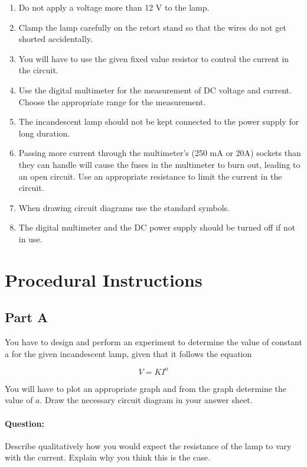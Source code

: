 \begin{enumerate}
\item Do not apply a voltage more than 12 V to the lamp.
\item Clamp the lamp carefully on the retort stand so that the wires do not get shorted accidentally.
\item You will have to use the given fixed value resistor to control the current in the circuit.
\item Use the digital multimeter for the measurement of DC voltage and current.  Choose the appropriate range for the measurement.
\item The incandescent lamp should not be kept connected to the power supply for long duration. 

\item Passing more current through the multimeter's (250 mA or 20A) sockets than they can handle will cause the fuses in the multimeter to burn out, leading to an open circuit. Use an appropriate resistance to limit the current in the circuit.

\item When drawing circuit diagrams use the standard symbols.

\item The digital multimeter and the DC power supply should be turned off if not in use.

\end{enumerate}


\section*{Procedural Instructions}

\subsection*{Part A}

You have to design and perform an experiment to determine the value of constant a for the given incandescent lamp, given that it follows the equation 

\begin{equation*}
V = K I^a
\end{equation*}

You will have to plot an appropriate graph and from the graph determine the value of $a$. Draw the necessary circuit diagram in your answer sheet.

\begin{question}
\paragraph{Question:} Describe qualitatively how you would expect the resistance of the lamp to vary with the current. Explain why you think this is the case.
\end{question}


